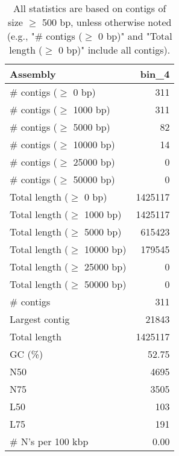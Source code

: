 \documentclass[12pt,a4paper]{article}
\begin{document}
\begin{table}[ht]
\begin{center}
\caption{All statistics are based on contigs of size $\geq$ 500 bp, unless otherwise noted (e.g., "\# contigs ($\geq$ 0 bp)" and "Total length ($\geq$ 0 bp)" include all contigs).}
\begin{tabular}{|l*{1}{|r}|}
\hline
Assembly & bin\_4 \\ \hline
\# contigs ($\geq$ 0 bp) & 311 \\ \hline
\# contigs ($\geq$ 1000 bp) & 311 \\ \hline
\# contigs ($\geq$ 5000 bp) & 82 \\ \hline
\# contigs ($\geq$ 10000 bp) & 14 \\ \hline
\# contigs ($\geq$ 25000 bp) & 0 \\ \hline
\# contigs ($\geq$ 50000 bp) & 0 \\ \hline
Total length ($\geq$ 0 bp) & 1425117 \\ \hline
Total length ($\geq$ 1000 bp) & 1425117 \\ \hline
Total length ($\geq$ 5000 bp) & 615423 \\ \hline
Total length ($\geq$ 10000 bp) & 179545 \\ \hline
Total length ($\geq$ 25000 bp) & 0 \\ \hline
Total length ($\geq$ 50000 bp) & 0 \\ \hline
\# contigs & 311 \\ \hline
Largest contig & 21843 \\ \hline
Total length & 1425117 \\ \hline
GC (\%) & 52.75 \\ \hline
N50 & 4695 \\ \hline
N75 & 3505 \\ \hline
L50 & 103 \\ \hline
L75 & 191 \\ \hline
\# N's per 100 kbp & 0.00 \\ \hline
\end{tabular}
\end{center}
\end{table}
\end{document}
